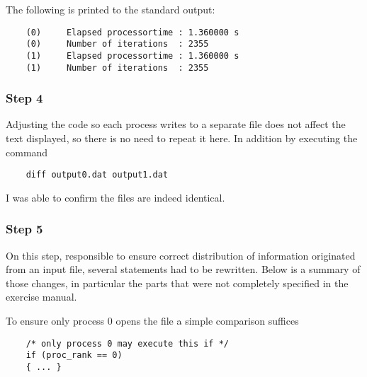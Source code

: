 The following is printed to the standard output:
\begin{lstlisting}
	(0)     Elapsed processortime : 1.360000 s
	(0)     Number of iterations  : 2355
	(1)     Elapsed processortime : 1.360000 s
	(1)     Number of iterations  : 2355
\end{lstlisting}



\subsubsection{Step 4}

Adjusting the code so each process writes to a separate file does not affect the text displayed, so there is no need to repeat it here. In addition by executing the command

\begin{lstlisting}
	diff output0.dat output1.dat
\end{lstlisting}

I was able to confirm the files are indeed identical.

\subsubsection{Step 5}

On this step, responsible to ensure correct distribution of information originated from an input file, several statements had to be rewritten. Below is a summary of those changes, in particular the parts that were not completely specified in the exercise manual.

To ensure only process 0 opens the file a simple comparison suffices
\begin{lstlisting}
	/* only process 0 may execute this if */
	if (proc_rank == 0)
	{ ... }
\end{lstlisting}

